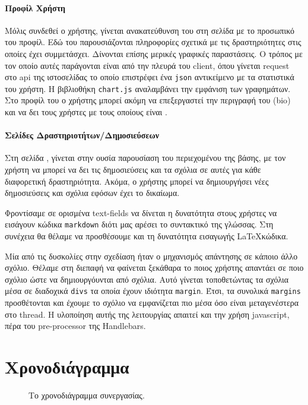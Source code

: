 \documentclass[acmtog, nonacm, language=english, language=greek]{acmart}
\newcommand{\en}[1]{\textlatin{#1}}
\newcommand{\src}[1]{\texttt{\en{#1}}}
\begin{document}
\paragraph{Προφίλ Χρήστη}

Μόλις συνδεθεί ο χρήστης, γίνεται ανακατεύθυνση του 
στη σελίδα με το προσωπικό του προφίλ. Εδώ του 
παρουσιάζονται πληροφορίες σχετικά με τις δραστηριότητες 
στις οποίες έχει συμμετάσχει. 
Δίνονται επίσης μερικές γραφικές παραστάσεις. Ο τρόπος με τον οποίο 
αυτές παράγονται είναι από την πλευρά του \en{client}, όπου γίνεται 
\en{request} στο \en{api} της ιστοσελίδας το οποίο επιστρέφει 
ένα \src{json} αντικείμενο με τα στατιστικά του χρήστη. 
Η βιβλιοθήκη \src{chart.js} \cite{ChartJS}
αναλαμβάνει την εμφάνιση των γραφημάτων.
Στο προφίλ του ο χρήστης μπορεί ακόμη να επεξεργαστεί την περιγραφή του 
(\en{bio}) και να δει τους χρήστες με τους οποίους είναι .

\paragraph{Σελίδες Δραστηριοτήτων/Δημοσιεύσεων}

Στη σελίδα \say{\en{Activities}}, γίνεται στην ουσία παρουσίαση του
περιεχομένου της βάσης, με τον χρήστη να μπορεί να δει τις δημοσιεύσεις και τα
σχόλια σε αυτές για κάθε διαφορετική δραστηριότητα. Ακόμα, ο χρήστης μπορεί να
δημιουργήσει νέες δημοσιεύσεις και σχόλια εφόσων έχει το δικαίωμα.

Φροντίσαμε σε ορισμένα \en{text-fields} να δίνεται η δυνατότητα 
στους χρήστες να εισάγουν κώδικα \src{markdown} διότι
μας αρέσει το συντακτικό της γλώσσας. Στη συνέχεια 
θα θέλαμε να προσθέσουμε και τη δυνατότητα εισαγωγής \LaTeX κώδικα.

Μία από τις δυσκολίες στην σχεδίαση ήταν ο μηχανισμός απάντησης
σε κάποιο άλλο σχόλιο. Θέλαμε στη διεπαφή να φαίνεται 
ξεκάθαρα το ποιος χρήστης απαντάει σε ποιο σχόλιο
ώστε να δημιουργόυνται  από σχόλια.
Αυτό γίνεται τοποθετώντας τα σχόλια μέσα σε διαδοχικά \src{divs}
τα οποία έχουν ιδιότητα \src{margin}. Έτσι, τα συνολικά 
\src{margins} προσθέτονται και έχουμε το σχόλιο να εμφανίζεται πιο μέσα 
όσο είναι μεταγενέστερα στο \en{thread}. Η υλοποίηση αυτής 
της λειτουργίας απαιτεί και την χρήση \en{javascript}, πέρα 
του \en{pre-processor} της \en{Handlebars}.

\section{Χρονοδιάγραμμα}

\begin{figure*}
\begin{center}
\end{center}
    \caption{Το χρονοδιάγραμμα συνεργασίας.}
\end{figure*}


\end{document}
